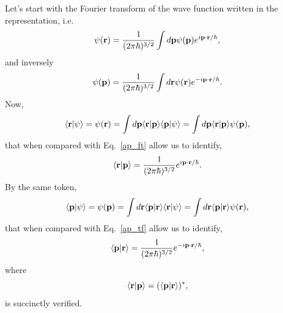 \documentclass[floatfix,prb,aps,superscriptaddress,11pt,preprint]{revtex4}
\begin{document}
Let's start with the Fourier transform of the wave function written in
the \sch~ representation, i.e.
\begin{equation}\label{ap_ft}
\psi(\mathbf{r}) = \frac{1}{(2\pi\hbar)^{3/2}}\int d\mathbf{p} \psi(\mathbf{p})e^{i\mathbf{p}\cdot\mathbf{r}/\hbar}
,
\end{equation}  
and inversely 
\begin{equation}\label{ap_tf}
\psi(\mathbf{p}) = \frac{1}{(2\pi\hbar)^{3/2}}\int d\mathbf{r} \psi(\mathbf{r})
e^{-i\mathbf{p}\cdot\mathbf{r}/\hbar}
.
\end{equation}  
Now,
\begin{equation}\label{rpsi}
\langle {\mathbf{r}} | {\psi} \rangle=\psi(\mathbf{r})=\int d\mathbf{p} \langle {\mathbf{r}} | {\mathbf{p}} \rangle\langle {\mathbf{p}} | {\psi} \rangle=
\int d\mathbf{p} \langle {\mathbf{r}} | {\mathbf{p}} \rangle\psi(\mathbf{p})
,
\end{equation}
that when compared with Eq.~\eqref{ap_ft} allow us to identify,
\begin{equation}\label{rp2}
\langle {\mathbf{r}} | {\mathbf{p}} \rangle=\frac{1}{(2\pi\hbar)^{3/2}}e^{i\mathbf{p}\cdot\mathbf{r}/\hbar}
.
\end{equation}
By the same token,
\begin{equation}\label{rpsi2}
\langle {\mathbf{p}} | {\psi} \rangle=\psi(\mathbf{p})=\int d\mathbf{r} \langle {\mathbf{p}} | {\mathbf{r}} \rangle\langle {\mathbf{r}} | {\psi} \rangle=
\int d\mathbf{r} \langle {\mathbf{p}} | {\mathbf{r}} \rangle\psi(\mathbf{r})
,
\end{equation}
that when compared with Eq.~\eqref{ap_tf} allow us to identify,
\begin{equation}\label{rp}
\langle {\mathbf{p}} | {\mathbf{r}} \rangle=\frac{1}{(2\pi\hbar)^{3/2}}e^{-i\mathbf{p}\cdot\mathbf{r}/\hbar}
,
\end{equation}
where
\begin{equation}\label{ap_good}
\langle {\mathbf{r}} | {\mathbf{p}} \rangle=(\langle {\mathbf{p}} | {\mathbf{r}} \rangle)^*
,
\end{equation}
is succinctly verified.
 
\end{document}
